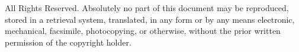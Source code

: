 \documentclass[oneside]{book}
\begin{document}
\noindent All Rights Reserved. Absolutely no part of this document may
be reproduced, stored in a retrieval system, translated, in any form
or by any means electronic, mechanical, facsimile, photocopying, or
otherwise, without the prior written permission of the copyright
holder.

\vspace*{\fill}




\newcommand{\centeringrule}[2]{%
  \hspace{\fill}%
  \rule{#1}{#2}%
  \hspace{\fill}%
}

\end{document}
